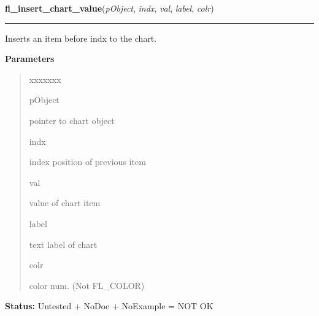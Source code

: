 \hspace{.8\funcindent}\begin{boxedminipage}{\funcwidth}

    \raggedright \textbf{fl\_insert\_chart\_value}(\textit{pObject}, \textit{indx}, \textit{val}, \textit{label}, \textit{colr})

    \vspace{-1.5ex}

    \rule{\textwidth}{0.5\fboxrule}
\setlength{\parskip}{2ex}
    Inserts an item before indx to the chart.

\setlength{\parskip}{1ex}
      \textbf{Parameters}
      \vspace{-1ex}

      \begin{quote}
        \begin{Ventry}{xxxxxxx}

          \item[pObject]

          pointer to chart object

          \item[indx]

          index position of previous item

          \item[val]

          value of chart item

          \item[label]

          text label of chart

          \item[colr]

          color num. (Not FL\_COLOR)

        \end{Ventry}

      \end{quote}

\textbf{Status:} Untested + NoDoc + NoExample = NOT OK



    \end{boxedminipage}

    \label{xformslib:library:fl_replace_chart_value}

    \vspace{0.5ex}

